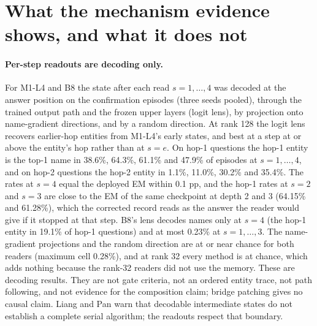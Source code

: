 \section{What the mechanism evidence shows, and what it does not}
\label{sec:mechanism}

\paragraph{Per-step readouts are decoding only.}
For M1-L4 and B8 the state after each read $s=1,\dots,4$ was decoded at the answer position on the confirmation episodes (three seeds pooled), through the trained output path and the frozen upper layers (logit lens), by projection onto name-gradient directions, and by a random direction.  %
At rank 128 the logit lens recovers earlier-hop entities from M1-L4's early states, and best at a step at or above the entity's hop rather than at $s=e$.
On hop-1 questions the hop-1 entity is the top-1 name in 38.6\%, 64.3\%, 61.1\% and 47.9\% of episodes at $s=1,\dots,4$, and on hop-2 questions the hop-2 entity in 1.1\%, 11.0\%, 30.2\% and 35.4\%.  %
The rates at $s=4$ equal the deployed EM within 0.1 pp, and the hop-1 rates at $s=2$ and $s=3$ are close to the EM of the same checkpoint at depth 2 and 3 (64.15\% and 61.28\%), which the corrected record reads as the answer the reader would give if it stopped at that step.  %
B8's lens decodes names only at $s=4$ (the hop-1 entity in 19.1\% of hop-1 questions) and at most 0.23\% at $s=1,\dots,3$.  %
The name-gradient projections and the random direction are at or near chance for both readers (maximum cell 0.28\%), and at rank 32 every method is at chance, which adds nothing because the rank-32 readers did not use the memory.  %
These are decoding results.
They are not gate criteria, not an ordered entity trace, not path following, and not evidence for the composition claim; bridge patching gives no causal claim.  %
Liang and Pan warn that decodable intermediate states do not establish a complete serial algorithm; the readouts respect that boundary.

